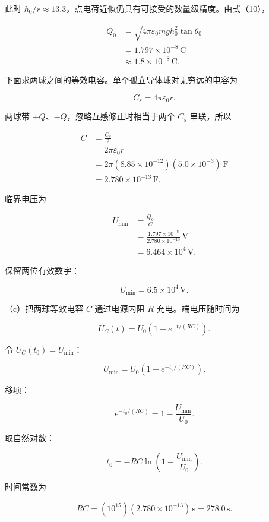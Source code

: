 \documentclass[12pt,a4paper,UTF8]{ctexart}
\begin{document}
此时
\(h_0/r\approx13.3\)，点电荷近似仍具有可接受的数量级精度。由式（10），

\[
\begin{aligned}
Q_0
&=\sqrt{4\pi\varepsilon_0mg h_0^2\tan\theta_0}\\
&=1.797\times10^{-8}\,\mathrm C\\
&\approx1.8\times10^{-8}\,\mathrm C.
\end{aligned} \tag{20}
\]

下面求两球之间的等效电容。单个孤立导体球对无穷远的电容为

\[
C_s=4\pi\varepsilon_0r. \tag{21}
\]

两球带 \(+Q\)、\(-Q\)，忽略互感修正时相当于两个 \(C_s\) 串联，所以

\[
\begin{aligned}
C
&=\frac{C_s}{2}\\
&=2\pi\varepsilon_0r\\
&=2\pi(8.85\times10^{-12})(5.0\times10^{-3})\,\mathrm F\\
&=2.780\times10^{-13}\,\mathrm F.
\end{aligned} \tag{22}
\]

临界电压为

\[
\begin{aligned}
U_{\min}
&=\frac{Q_0}{C}\\
&=\frac{1.797\times10^{-8}}{2.780\times10^{-13}}\,\mathrm V\\
&=6.464\times10^4\,\mathrm V.
\end{aligned} \tag{23}
\]

保留两位有效数字：

\[
\boxed{U_{\min}=6.5\times10^4\,\mathrm V}. \tag{24}
\]

（c）把两球等效电容 \(C\) 通过电源内阻 \(R\) 充电。端电压随时间为

\[
U_C(t)=U_0\left(1-e^{-t/(RC)}\right). \tag{25}
\]

令 \(U_C(t_0)=U_{\min}\)：

\[
U_{\min}
=U_0\left(1-e^{-t_0/(RC)}\right). \tag{26}
\]

移项：

\[
e^{-t_0/(RC)}
=1-\frac{U_{\min}}{U_0}. \tag{27}
\]

取自然对数：

\[
t_0
=-RC\ln\left(1-\frac{U_{\min}}{U_0}\right). \tag{28}
\]

时间常数为

\[
RC=(10^{15})(2.780\times10^{-13})\,\mathrm s
=278.0\,\mathrm s. \tag{29}
\]
\end{document}
